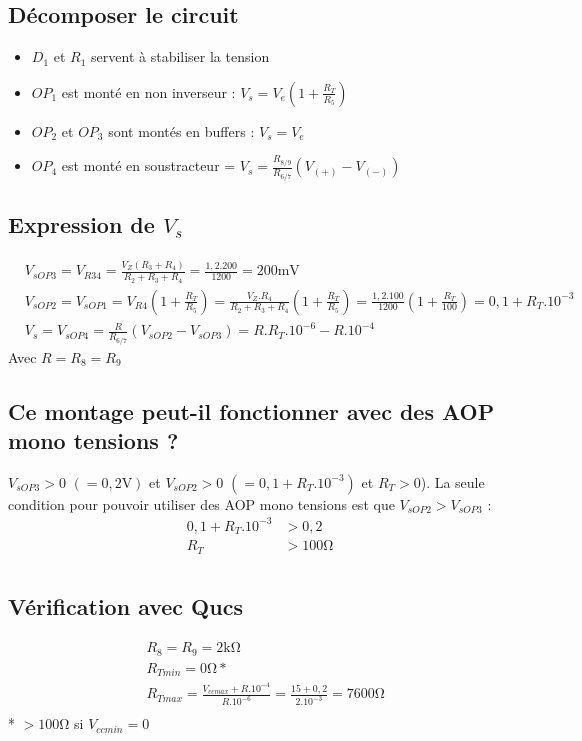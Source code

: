 \documentclass{article}
\begin{document}
\subsection{Décomposer le circuit}
\begin{itemize}
    \item $D_1$ et $R_1$ servent à stabiliser la tension
    \item $OP_1$ est monté en non inverseur : $V_s = V_e\left(1 + \frac{R_T}{R_5}\right)$
    \item $OP_2$ et $OP_3$ sont montés en buffers : $V_s = V_e$
    \item $OP_4$ est monté en soustracteur = $V_s = \frac{R_{8/9}}{R_{6/7}}(V_{(+)} - V_{(-)})$
\end{itemize}

\subsection{Expression de $V_s$}
\begin{align*}
    &V_{s OP3} = V_{R34} = \frac{V_Z(R_3 + R_4)}{R_2 + R_3 + R_4} = \frac{1,2.200}{1200} = 200 \si{\milli\volt}\\
    &V_{s OP2} = V_{s OP1} = V_{R4} \left(1 + \frac{R_T}{R_5}\right)= \frac{V_Z.R_4}{R_2 + R_3 + R_4} \left(1 + \frac{R_T}{R_5}\right) = \frac{1,2.100}{1200} \left(1 + \frac{R_T}{100}\right) = 0,1 + R_T . 10^{-3}\\
    & V_{s} = V_{s OP4} = \frac{R}{R_{6/7}}\left(V_{s OP2} - V_{s OP3}\right) = R.R_T.10^{-6} - R.10^{-4}
\end{align*}
Avec $R = R_8 = R_9$

\subsection{Ce montage peut-il fonctionner avec des AOP mono tensions ?}
$V_{sOP3} > 0$ $(= 0,2 \si{\volt})$ et $V_{sOP2} > 0$ $(= 0,1 + R_T . 10^{-3})$ et $R_T > 0$). La seule condition pour pouvoir utiliser des AOP mono tensions est que $V_{sOP2} > V_{sOP3}$ :
\begin{align*}
    0,1 + R_T . 10^{-3} &> 0,2\\
    R_T &> 100\si{\ohm}\\
\end{align*}

\subsection{Vérification avec Qucs}
\begin{align*}
    & R_8 = R_9 = 2 \si{\kilo\ohm}\\
    & R_{T min} = 0 \si{\ohm}*\\
    & R_{T max} = \frac{V_{cc max} + R.10^{-4}}{R.10^{-6}} = \frac{15 + 0,2}{2.10^{-3}} = 7600 \si{\ohm}\\
\end{align*}
* $> 100 \si{\ohm}$ si $V_{cc min} = 0$
\end{document}
